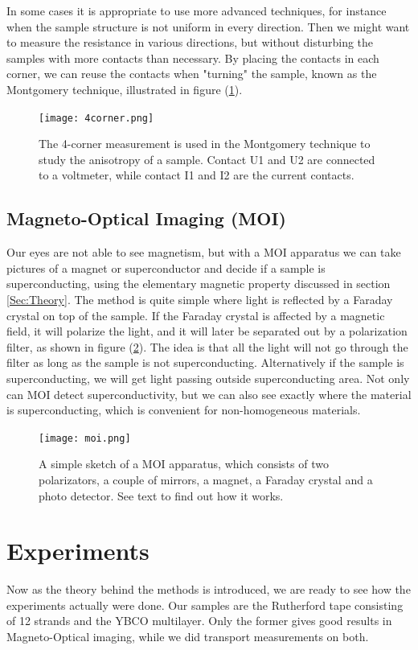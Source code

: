 \documentclass{comjnl}
\begin{document}
In some cases it is appropriate to use more advanced techniques, for instance when the sample structure is not uniform in every direction. Then we might want to measure the resistance in various directions, but without disturbing the samples with more contacts than necessary. By placing the contacts in each corner, we can reuse the contacts when "turning" the sample, known as the Montgomery technique, illustrated in figure (\ref{fig:4corner}). 

\begin{figure}[h]
\centering
\texttt{[image: 4corner.png]}
\caption{The 4-corner measurement is used in the Montgomery technique to study the anisotropy of a sample. Contact U1 and U2 are connected to a voltmeter, while contact I1 and I2 are the current contacts. \label{fig:4corner}}
\end{figure}

\subsection{Magneto-Optical Imaging (MOI)}
Our eyes are not able to see magnetism, but with a MOI apparatus we can take pictures of a magnet or superconductor and decide if a sample is superconducting, using the elementary magnetic property discussed in section \ref{Sec:Theory}. The method is quite simple where light is reflected by a Faraday crystal on top of the sample. If the Faraday crystal is affected by a magnetic field, it will polarize the light, and it will later be separated out by a polarization filter, as shown in figure (\ref{fig:MOI}). The idea is that all the light will not go through the filter as long as the sample is not superconducting. Alternatively if the sample is superconducting, we will get light passing outside superconducting area. Not only can MOI detect superconductivity, but we can also see exactly where the material is superconducting, which is convenient for non-homogeneous materials. 
\begin{figure}[h]
\centering
\texttt{[image: moi.png]}
\caption{A simple sketch of a MOI apparatus, which consists of two polarizators, a couple of mirrors, a magnet, a Faraday crystal and a photo detector. See text to find out how it works. \label{fig:MOI}}
\end{figure}

\section{Experiments}\label{Sec:Experiments}
Now as the theory behind the methods is introduced, we are ready to see how the experiments actually were done. Our samples are the Rutherford tape consisting of 12 strands and the YBCO multilayer. Only the former gives good results in Magneto-Optical imaging, while we did transport measurements on both. 
\end{document}
